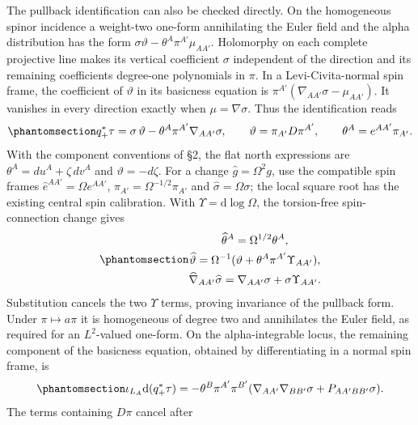 \documentclass[
  english,
  11pt,
  reqno]{amsart}
\begin{document}
The pullback identification can also be checked directly. On the
homogeneous spinor incidence a weight-two one-form annihilating the
Euler field and the alpha distribution has the form
\(\sigma\vartheta-\theta^A\pi^{A'}\mu_{AA'}\). Holomorphy on each
complete projective line makes its vertical coefficient \(\sigma\)
independent of the direction and its remaining coefficients degree-one
polynomials in \(\pi\). In a Levi-Civita-normal spin frame, the
coefficient of \(\vartheta\) in its basicness equation is
\(\pi^{A'}(\nabla_{AA'}\sigma-\mu_{AA'})\). It vanishes in every
direction exactly when \(\mu=\nabla\sigma\). Thus the identification
reads
\begin{equation}\protect\phantomsection\label{eq:gg-ordinary-section-density}{
 q_+^*\tau=\sigma\,\vartheta
       -\theta^A\pi^{A'}\nabla_{AA'}\sigma,\qquad
 \vartheta=\pi_{A'}D\pi^{A'},\qquad
 \theta^A=e^{AA'}\pi_{A'} .
}\end{equation} With the component conventions of §2, the flat north
expressions are \(\theta^A=du^A+\zeta\,dv^A\) and \(\vartheta=-d\zeta\).
For a change \(\widehat g=\Omega^2g\), use the compatible spin frames
\(\widehat e^{AA'}=\Omega e^{AA'}\),
\(\widehat\pi_{A'}=\Omega^{-1/2}\pi_{A'}\) and
\(\widehat\sigma=\Omega\sigma\); the local square root has the existing
central spin calibration. With \(\Upsilon=\mathrm d\log\Omega\), the
torsion-free spin-connection change gives
\begin{equation}\protect\phantomsection\label{eq:gg-ordinary-section-scale-invariance}{\begin{gathered}
\widehat\theta^A=\Omega^{1/2}\theta^A, \\
\widehat\vartheta=\Omega^{-1}
   (\vartheta+\theta^A\pi^{A'}\Upsilon_{AA'}), \\
\widehat\nabla_{AA'}\widehat\sigma
          =\nabla_{AA'}\sigma+\sigma\Upsilon_{AA'}.
\end{gathered}}\end{equation} Substitution cancels the two \(\Upsilon\) terms, proving
invariance of the pullback form. Under \(\pi\mapsto a\pi\) it is
homogeneous of degree two and annihilates the Euler field, as required
for an \(L^2\)-valued one-form. On the alpha-integrable locus, the
remaining component of the basicness equation, obtained by
differentiating in a normal spin frame, is
\begin{equation}\protect\phantomsection\label{eq:gg-ordinary-section-basicness}{
 \iota_{L_A}\mathrm d(q_+^*\tau)
 =-\theta^B\pi^{A'}\pi^{B'}
       (\nabla_{AA'}\nabla_{BB'}\sigma+P_{AA'BB'}\sigma).
}\end{equation} The terms containing \(D\pi\) cancel after
\end{document}
